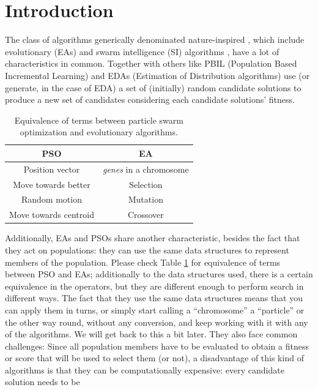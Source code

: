 \documentclass[runningheads]{llncs}
\begin{document}
\section{Introduction}

The class of algorithms generically denominated nature-inspired
\cite{yang2014nature}, which  include evolutionary (EAs) and swarm
intelligence (SI) algorithms
\cite{back1996evolutionary,kennedy2006swarm}, have a lot of
characteristics in common.
Together with others like PBIL (Population Based Incremental Learning)
\cite{baluja1994population} and EDAs (Estimation of Distribution
algorithms) \cite{larranaga2001estimation} use (or generate, in the
case of EDA) a set of (initially) random candidate solutions to
produce a new set of candidates considering each candidate solutions'
fitness.

\begin{table}[h!tb]
    \caption{Equivalence of terms between particle swarm optimization
    and evolutionary algorithms. \label{tab:equivalence}}
\centering
\begin{tabular}{|c|c|}
  \hline
  PSO & EA \\ \hline
  Position vector & {\em genes} in a chromosome \\ \hline
  Move towards better & Selection  \\ \hline
  Random motion & Mutation \\ \hline
  Move towards centroid & Crossover \\ \hline
\end{tabular}
\end{table}
%
Additionally, EAs and PSOs share another characteristic, besides the fact that they
act on populations: they can use the same data structures to
represent  members of the population. Please check Table
\ref{tab:equivalence} for equivalence of terms between PSO and EAs;
additionally to the data structures used, there is a certain
equivalence in the operators, but they are different enough to perform
search in different ways. The fact that they use the same data
structures means that you can apply them in turns, or simply start
calling a ``chromosome'' a ``particle'' or the other way round,
without any conversion, and keep working with it with any of the
algorithms. We will get back to this a bit later.
They also face common challenges: Since all population members have to
be evaluated to obtain a fitness or score that will be used to select
them (or not), a disadvantage of this kind of algorithms is that they
can be computationally expensive: every candidate solution needs to be
\end{document}
